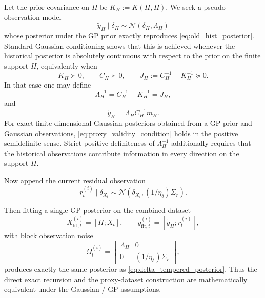 \documentclass{article}
\begin{document}
Let the prior covariance on $H$ be $K_H:=K(H,H)$. We seek a pseudo-observation model
\begin{equation}
\widetilde y_H \mid \delta_H
\sim
\mathcal N(\delta_H,\Lambda_H)
\label{eq:pseudo_observation_model}
\end{equation}
whose posterior under the GP prior exactly reproduces \eqref{eq:old_hist_posterior}. Standard Gaussian conditioning shows that this is achieved whenever the historical posterior is absolutely continuous with respect to the prior on the finite support $H$, equivalently when
\begin{equation}
K_H \succ 0,\qquad C_H \succ 0,\qquad
J_H := C_H^{-1}-K_H^{-1} \succeq 0.
\label{eq:proxy_validity_condition}
\end{equation}
In that case one may define
\begin{equation}
\Lambda_H^{-1}
=
C_H^{-1}-K_H^{-1}
=
J_H,
\label{eq:proxy_lambda}
\end{equation}
and
\begin{equation}
\widetilde y_H
=
\Lambda_H C_H^{-1} m_H.
\label{eq:proxy_y}
\end{equation}
For exact finite-dimensional Gaussian posteriors obtained from a GP prior and Gaussian observations, \eqref{eq:proxy_validity_condition} holds in the positive semidefinite sense. Strict positive definiteness of $\Lambda_H^{-1}$ additionally requires that the historical observations contribute information in every direction on the support $H$.

Now append the current residual observation
\begin{equation}
r_t^{(i)} \mid \delta_{X_t}
\sim
\mathcal N(\delta_{X_t}, (1/\eta_\delta)\Sigma_r).
\label{eq:proxy_current_batch}
\end{equation}

Then fitting a single GP posterior on the combined dataset
\begin{equation}
X_{\mathrm{fit},t}^{(i)}=[H;X_t],
\qquad
y_{\mathrm{fit},t}^{(i)}=[\widetilde y_H;r_t^{(i)}],
\label{eq:proxy_dataset}
\end{equation}
with block observation noise
\begin{equation}
\Omega_t^{(i)}
=
\begin{bmatrix}
\Lambda_H & 0\\
0 & (1/\eta_\delta)\Sigma_r
\end{bmatrix},
\label{eq:proxy_noise}
\end{equation}
produces exactly the same posterior as \eqref{eq:delta_tempered_posterior}. Thus the direct exact recursion and the proxy-dataset construction are mathematically equivalent under the Gaussian / GP assumptions.
\end{document}

